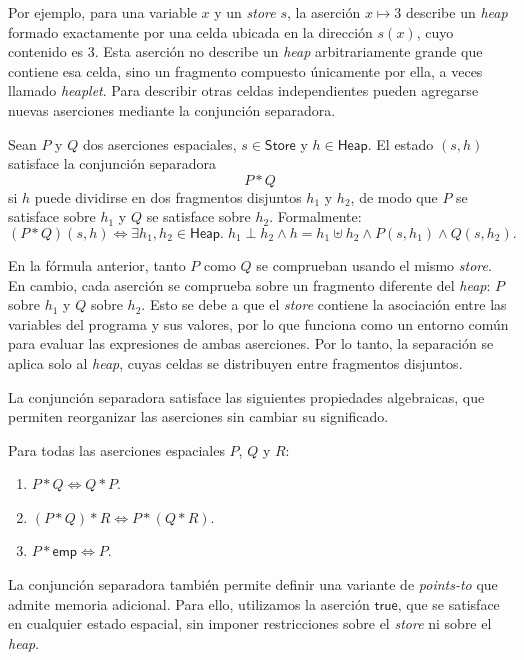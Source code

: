 \documentclass[a4paper,	11pt]{report}
\begin{document}
Por ejemplo,
para una variable $x$ y un \emph{store} $s$,
la aserción $x \mapsto 3$ describe un \emph{heap} formado exactamente por una celda ubicada en la dirección $s(x)$,
cuyo contenido es 3.
Esta aserción no describe un \emph{heap} arbitrariamente grande que contiene esa celda,
sino un fragmento compuesto únicamente por ella,
a veces llamado \emph{heaplet}.
Para describir otras celdas independientes pueden agregarse nuevas aserciones mediante la conjunción separadora.

\begin{definicion}
\label{def:sep-conj}
Sean $P$ y $Q$ dos aserciones espaciales, $s \in \mathsf{Store}$ y $h \in \mathsf{Heap}$.
El estado $(s, h)$ satisface la conjunción separadora
$$P * Q$$
si $h$ puede dividirse en dos fragmentos disjuntos $h_1$ y $h_2$, de modo que $P$ se satisface sobre $h_1$ y $Q$ se satisface sobre $h_2$.
Formalmente:
$$(P * Q)(s, h) \iff \exists h_1, h_2 \in \mathsf{Heap}. \; h_1 \perp h_2 \land h = h_1 \uplus h_2 \land P(s, h_1) \land Q(s, h_2).$$
\end{definicion}

En la fórmula anterior,
tanto $P$ como $Q$ se comprueban usando el mismo \emph{store}.
En cambio, cada aserción se comprueba sobre un fragmento diferente del \emph{heap}:
$P$ sobre $h_1$ y $Q$ sobre $h_2$.
Esto se debe a que el \emph{store} contiene la asociación entre las variables del programa y sus valores,
por lo que funciona como un entorno común para evaluar las expresiones de ambas aserciones.
Por lo tanto, la separación se aplica solo al \emph{heap},
cuyas celdas se distribuyen entre fragmentos disjuntos.

La conjunción separadora satisface las siguientes propiedades algebraicas,
que permiten reorganizar las aserciones sin cambiar su significado.

\begin{lema}
Para todas las aserciones espaciales $P$, $Q$ y $R$:
\begin{enumerate}
  \item $P * Q \iff Q * P$.
  \item $(P * Q) * R \iff P * (Q * R)$.
  \item $P * \mathsf{emp} \iff P$.
\end{enumerate}
\end{lema}

La conjunción separadora también permite definir una variante de \emph{points-to} que admite memoria adicional.
Para ello,
utilizamos la aserción $\mathsf{true}$,
que se satisface en cualquier estado espacial,
sin imponer restricciones sobre el \emph{store} ni sobre el \emph{heap}.
\end{document}

